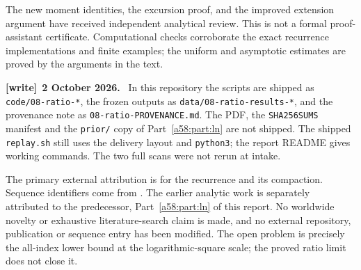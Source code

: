 \documentclass[11pt,letterpaper]{article}
\newcommand{\file}[1]{\nolinkurl{#1}}
\theoremstyle{remark}
\newenvironment{writenote}[1][]{\par\smallskip\begingroup\small
 \noindent\textbf{[write]}\if\relax\detokenize{#1}\relax\else~\textbf{#1.}\fi\ }%
 {\par\endgroup\smallskip}
\begin{document}
The new moment identities, the excursion proof, and the improved
extension argument have received independent analytical review. This
is not a formal proof-assistant certificate. Computational checks
corroborate the exact recurrence implementations and finite examples;
the uniform and asymptotic estimates are proved by the arguments in
the text.
\begin{writenote}[2 October 2026]
In this repository the scripts are shipped as \file{code/08-ratio-*}, the frozen outputs as \file{data/08-ratio-results-*}, and the provenance note as \file{08-ratio-PROVENANCE.md}. The PDF, the \texttt{SHA256SUMS} manifest and the \file{prior/} copy of Part~\ref{a58:part:ln} are not shipped. The shipped \file{replay.sh} still uses the delivery layout and \texttt{python3}; the report README gives working commands. The two full scans were not rerun at intake.
\end{writenote}

The primary external attribution is \cite{CCEG} for the recurrence and
its compaction. Sequence identifiers come from \cite{OEIS,OEIStriangle}.
The earlier analytic work is separately attributed to the predecessor, Part~\ref{a58:part:ln} of this report.
No worldwide novelty or exhaustive literature-search claim is made,
and no external repository, publication or sequence entry has been
modified. The open problem is precisely the all-index lower bound at
the logarithmic-square scale; the proved ratio limit does not close it.


\clearpage
\end{document}
